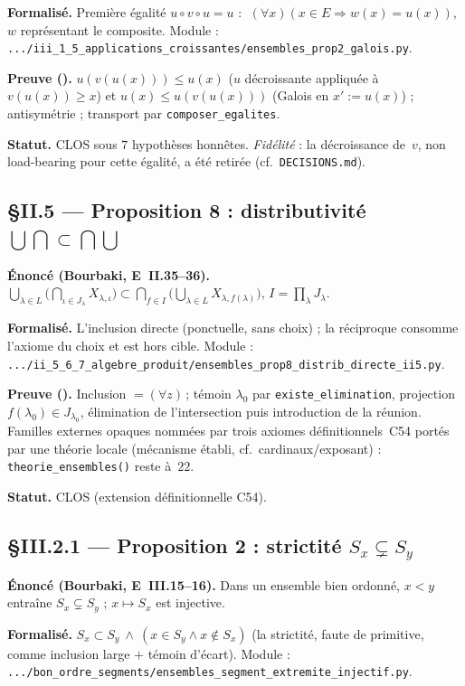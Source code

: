 \textbf{Formalisé.} Première égalité $u\circ v\circ u=u$ : $\;(\forall x)(x\in E\Rightarrow w(x)=u(x))$,
$w$ représentant le composite. Module :
\texttt{.../iii\_1\_5\_applications\_croissantes/ensembles\_prop2\_galois.py}.

\textbf{Preuve (\Nstar).} $u(v(u(x)))\leq u(x)$ ($u$ décroissante appliquée à $v(u(x))\geq x$)
et $u(x)\leq u(v(u(x)))$ (Galois en $x'{:=}u(x)$) ; antisymétrie ; transport par
\texttt{composer\_egalites}.

\textbf{Statut.} CLOS sous $7$ hypothèses honnêtes. \emph{Fidélité} : la décroissance
de~$v$, non load-bearing pour cette égalité, a été retirée (cf.\ \texttt{DECISIONS.md}).

\subsection{§II.5 --- Proposition 8 : distributivité $\bigcup\bigcap\subset\bigcap\bigcup$}
\textbf{Énoncé (Bourbaki, E~II.35--36).}
$\bigcup_{\lambda\in L}\bigl(\bigcap_{\iota\in J_\lambda}X_{\lambda,\iota}\bigr)
\subset \bigcap_{f\in I}\bigl(\bigcup_{\lambda\in L}X_{\lambda,f(\lambda)}\bigr)$, $I=\prod_\lambda J_\lambda$.

\textbf{Formalisé.} L'inclusion directe (ponctuelle, sans choix) ; la réciproque
consomme l'axiome du choix et est hors cible. Module :
\texttt{.../ii\_5\_6\_7\_algebre\_produit/ensembles\_prop8\_distrib\_directe\_ii5.py}.

\textbf{Preuve (\Nstar).} Inclusion $=(\forall z)$\,; témoin $\lambda_0$ par
\texttt{existe\_elimination}, projection $f(\lambda_0)\in J_{\lambda_0}$, élimination de
l'intersection puis introduction de la réunion. Familles externes opaques nommées par
trois axiomes définitionnels~C54 portés par une théorie locale (mécanisme établi,
cf.\ cardinaux/exposant) : \texttt{theorie\_ensembles()} reste à~$22$.

\textbf{Statut.} CLOS (extension définitionnelle C54).

\subsection{§III.2.1 --- Proposition 2 : strictité $S_x\subsetneq S_y$}
\textbf{Énoncé (Bourbaki, E~III.15--16).} Dans un ensemble bien ordonné, $x<y$
entraîne $S_x\subsetneq S_y$ ; $x\mapsto S_x$ est injective.

\textbf{Formalisé.} $S_x\subset S_y\ \wedge\ (x\in S_y\wedge x\notin S_x)$ (la
strictité, faute de primitive, comme inclusion large $+$ témoin d'écart). Module :
\texttt{.../bon\_ordre\_segments/ensembles\_segment\_extremite\_injectif.py}.

